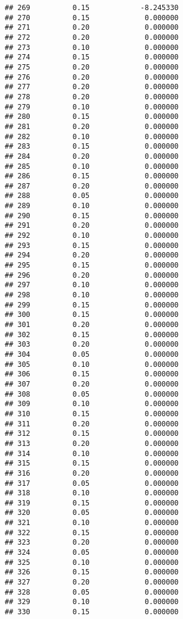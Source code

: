 \documentclass[
]{article}
\begin{document}
\begin{verbatim}
## 269          0.15            -8.245330
## 270          0.15             0.000000
## 271          0.20             0.000000
## 272          0.20             0.000000
## 273          0.10             0.000000
## 274          0.15             0.000000
## 275          0.20             0.000000
## 276          0.20             0.000000
## 277          0.20             0.000000
## 278          0.20             0.000000
## 279          0.10             0.000000
## 280          0.15             0.000000
## 281          0.20             0.000000
## 282          0.10             0.000000
## 283          0.15             0.000000
## 284          0.20             0.000000
## 285          0.10             0.000000
## 286          0.15             0.000000
## 287          0.20             0.000000
## 288          0.05             0.000000
## 289          0.10             0.000000
## 290          0.15             0.000000
## 291          0.20             0.000000
## 292          0.10             0.000000
## 293          0.15             0.000000
## 294          0.20             0.000000
## 295          0.15             0.000000
## 296          0.20             0.000000
## 297          0.10             0.000000
## 298          0.10             0.000000
## 299          0.15             0.000000
## 300          0.15             0.000000
## 301          0.20             0.000000
## 302          0.15             0.000000
## 303          0.20             0.000000
## 304          0.05             0.000000
## 305          0.10             0.000000
## 306          0.15             0.000000
## 307          0.20             0.000000
## 308          0.05             0.000000
## 309          0.10             0.000000
## 310          0.15             0.000000
## 311          0.20             0.000000
## 312          0.15             0.000000
## 313          0.20             0.000000
## 314          0.10             0.000000
## 315          0.15             0.000000
## 316          0.20             0.000000
## 317          0.05             0.000000
## 318          0.10             0.000000
## 319          0.15             0.000000
## 320          0.05             0.000000
## 321          0.10             0.000000
## 322          0.15             0.000000
## 323          0.20             0.000000
## 324          0.05             0.000000
## 325          0.10             0.000000
## 326          0.15             0.000000
## 327          0.20             0.000000
## 328          0.05             0.000000
## 329          0.10             0.000000
## 330          0.15             0.000000

\end{verbatim}
\end{document}
